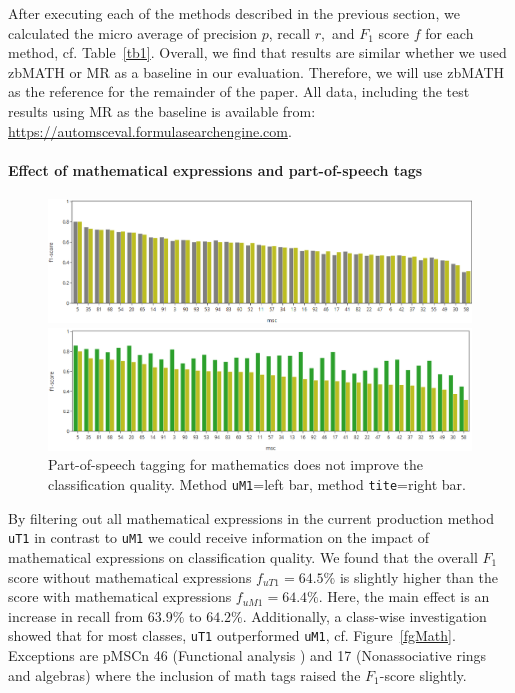 After executing each of the methods described in the previous section, we calculated the micro average of precision \(p\), recall \(r,\) and \(F_{1}\) score \(f\) for each method, cf. Table~\ref{tb1}.
Overall, we find that results are similar whether we used zbMATH or MR as a baseline in our evaluation.
Therefore, we will use zbMATH as the reference for the remainder of the paper. All data, including the test results using MR as the baseline is available from: \url{https://automsceval.formulasearchengine.com}.


\paragraph{Effect of mathematical expressions and part-of-speech tags}
\begin{figure}[ht]
  \centering
  \includegraphics[width=\textwidth]{mathEncoding.png}
  \caption{Mathematical symbols in \texttt{title} and abstract \texttt{text} do not improve the classification quality. Method \texttt{uT1} =left bar; method \texttt{uM1}=right bar%
 }\label{fgMath}
  \includegraphics[width=\textwidth]{POSeffekt.png}
\caption{Part-of-speech tagging for mathematics does not improve the classification quality. Method \texttt{uM1}=left bar, method \texttt{tite}=right bar.}\label{fgPOS}
\end{figure}
By filtering out all mathematical expressions in the current production method \texttt{uT1} in contrast to \texttt{uM1} we could receive information on the impact of mathematical expressions on classification quality.
We found that the overall \(F_{1}\) score without mathematical expressions \(f_{uT1} = 64.5\%\) is slightly higher than the score with mathematical expressions \(f_{uM1} = 64.4\%.\)
Here, the main effect is an increase in recall from \(63.9\%\) to \(64.2\%.\)
Additionally, a class-wise investigation showed that for most classes, \texttt{uT1} outperformed \texttt{uM1}, cf. Figure~\ref{fgMath}.
Exceptions are pMSCn 46 (Functional analysis ) and 17 (Nonassociative rings and algebras) where the inclusion of math tags raised the \(F_{1}\)-score slightly.

